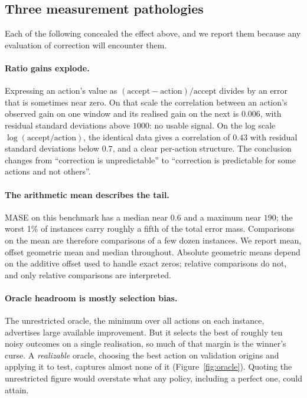 \subsection{Three measurement pathologies}
\label{sec:pathologies}

Each of the following concealed the effect above, and we report them because any
evaluation of correction will encounter them.

\paragraph{Ratio gains explode.}
Expressing an action's value as $(\text{accept} - \text{action}) / \text{accept}$ divides
by an error that is sometimes near zero. On that scale the correlation between an
action's observed gain on one window and its realised gain on the next is $0.006$, with
residual standard deviations above $1000$: no usable signal. On the log scale
$\log(\text{accept}/\text{action})$, the identical data gives a correlation of $0.43$
with residual standard deviations below $0.7$, and a clear per-action structure. The
conclusion changes from ``correction is unpredictable'' to ``correction is predictable
for some actions and not others''.

\paragraph{The arithmetic mean describes the tail.}
MASE on this benchmark has a median near $0.6$ and a maximum near $190$; the worst 1\% of
instances carry roughly a fifth of the total error mass. Comparisons on the mean are
therefore comparisons of a few dozen instances. We report mean, offset geometric mean and
median throughout. Absolute geometric means depend on the additive offset used to handle
exact zeros; relative comparisons do not, and only relative comparisons are interpreted.

\paragraph{Oracle headroom is mostly selection bias.}
The unrestricted oracle, the minimum over all actions on each instance, advertises
large available improvement. But it selects the best of roughly ten noisy outcomes on a
single realisation, so much of that margin is the winner's curse. A \emph{realizable}
oracle, choosing the best action on validation origins and applying it to test, captures
almost none of it (Figure~\ref{fig:oracle}). Quoting the unrestricted figure would
overstate what any policy, including a perfect one, could attain.

